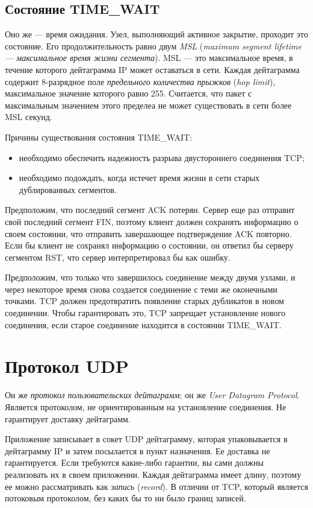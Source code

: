 \subsection{Состояние TIME\_WAIT}
Оно же --- время ожидания. Узел, выполняющий активное закрытие, проходит это состояние. Его продолжительность равно двум \emph{MSL} (\emph{maximum segment lifetime --- максимальное время жизни сегмента}). MSL --- это максимальное время, в течение которого дейтаграмма IP может оставаться в сети. Каждая дейтаграмма содержит 8-разрядное поле \emph{предельного количества прыжков} (\emph{hop limit}), максимальное значение которого равно 255. Считается, что пакет с максимальным значением этого пределеа не может существовать в сети более MSL секунд.

Причины существования состояния TIME\_WAIT:
\begin{itemize}
  \item необходимо обеспечить надежность разрыва двустороннего соединения TCP;
  \item необходимо подождать, когда истечет время жизни в сети старых дублированных сегментов.
\end{itemize}

Предположим, что последний сегмент ACK потерян. Сервер еще раз отправит свой последний сегмент FIN, поэтому клиент должен сохранять информацию о своем состоянии, что отправить завершающее подтверждение ACK повторно. Если бы клиент не сохранял информацию о состоянии, он ответил бы серверу сегментом RST, что сервер интерпретировал бы как ошибку.

Предположим, что только что завершилось соединение между двумя узлами, и через некоторое время снова создается соединение с теми же оконечными точками. TCP должен предотвратить появление старых дубликатов в новом соединении. Чтобы гарантировать это, TCP запрещает установление нового соединения, если старое соединение находится в состоянии TIME\_WAIT.

\section{Протокол UDP}
\label{sec:udp}
Он же \emph{протокол пользовательских дейтаграмм}; он же \emph{User Datagram Protocol}. Является протоколом, не ориентированным на установление соединения. Не гарантирует доставку дейтаграмм.

Приложение записывает в сокет UDP дейтаграмму, которая упаковывается в дейтаграмму IP и затем посылается в пункт назначения. Ее доставка не гарантируется. Если требуются какие-либо гарантии, вы сами должны реализовать их в своем приложении. Каждая дейтаграмма имеет длину, поэтому ее можно рассматривать как \emph{запись} (\emph{record}). В отличии от TCP, который является потоковым протоколом, без каких бы то ни было границ записей.

